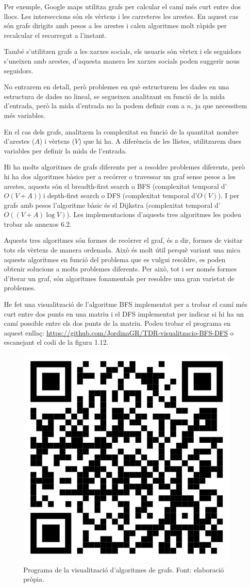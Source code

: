 Per exemple, Google maps utilitza grafs per calcular el camí més curt entre dos llocs. Les interseccions són els vèrtexs i les carreteres les arestes. En aquest cas són grafs dirigits amb pesos a les arestes i calen algoritmes molt ràpids per recalcular el recorregut a l'instant.

També s'utilitzen grafs a les xarxes socials, els usuaris són vèrtex i els seguidors s'uneixen amb arestes, d'aquesta manera les xarxes socials poden suggerir nous seguidors.

No entrarem en detall, però problemes en què estructurem les dades en una estructura de dades no lineal, se segueixen analitzant en funció de la mida d'entrada, però la mida d'entrada no la podem definir com a $n$, ja que necessitem més variables.

En el cas dels grafs, analitzem la complexitat en funció de la quantitat nombre d'arestes ($A$) i vèrtexs ($V$) que hi ha. A diferència de les llistes, utilitzarem dues variables per definir la mida de l'entrada.

Hi ha molts algoritmes de grafs diferents per a resoldre problemes diferents, però hi ha dos algoritmes bàsics per a recórrer o travessar un graf sense pesos a les arestes, aquests són el breadth-first search o BFS (complexitat temporal d'$O(V + A)$) i depth-first search o DFS (complexitat temporal d'$O(V)$). I per grafs amb pesos l'algoritme bàsic és el Dijkstra (complexitat temporal d'$O((V + A)\log{V})$). Les implementacions d'aquests tres algoritmes les podeu trobar als annexos 6.2.

Aquests tres algoritmes són formes de recórrer el graf, és a dir, formes de visitar tots els vèrtexs de manera ordenada. Això és molt útil perquè variant una mica aquests algoritmes en funció del problema que es vulgui resoldre, es poden obtenir solucions a molts problemes diferents. Per això, tot i ser només formes d'iterar un graf, són algoritmes fonamentals per resoldre una gran varietat de problemes.

He fet una visualització de l'algoritme BFS implementat per a trobar el camí més curt entre dos punts en una matriu i el DFS implementat per indicar si hi ha un camí possible entre els dos punts de la matriu. Podeu trobar el programa en aquest enllaç: \url{https://github.com/JordinaGR/TDR-visualitzacio-BFS-DFS} o escanejant el codi de la figura 1.12.
\vspace{18pt}
\begin{figure}[H]
    \centering
    \includegraphics[width=.15\textwidth]{capitols/figures/17.png}
    \caption[Programa de la visualització d'algoritmes de grafs.]{Programa de la visualització d'algoritmes de grafs. Font: elaboració pròpia.}
    \label{fig:my_label}
\end{figure}

